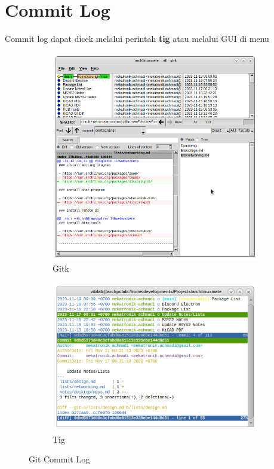 \documentclass[12pt]{book}
\begin{document}
	\section{Commit Log}
	
	Commit log dapat dicek melalui perintah \textbf{tig} atau melalui GUI di menu 
	
	\begin{figure}[!ht]
		\centering
		\begin{subfigure}[t]{0.45\textwidth}
			\includegraphics[width=\textwidth]{images/git/gitk}
			\caption{Gitk}
		\end{subfigure}
		\begin{subfigure}[t]{0.45\textwidth}
			\includegraphics[width=\textwidth]{images/git/tig}
			\caption{Tig}
		\end{subfigure}
		\caption{Git Commit Log}
	\end{figure}
	
\end{document}
